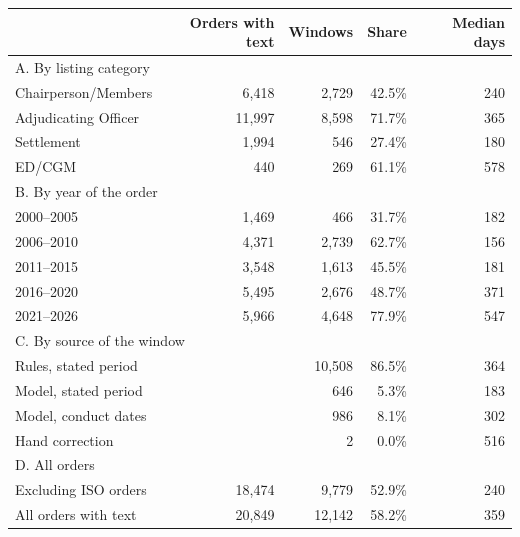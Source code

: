 \begin{tabular*}{\textwidth}[]{l@{\extracolsep\fill}rrrr}
\toprule
 & Orders with text & Windows & Share & Median days\\
\midrule
\multicolumn{5}{l}{A. By listing category}\\
Chairperson/Members & 6,418 & 2,729 & 42.5\% & 240\\
Adjudicating Officer & 11,997 & 8,598 & 71.7\% & 365\\
Settlement & 1,994 & 546 & 27.4\% & 180\\
ED/CGM & 440 & 269 & 61.1\% & 578\\
\midrule
\multicolumn{5}{l}{B. By year of the order}\\
2000--2005 & 1,469 & 466 & 31.7\% & 182\\
2006--2010 & 4,371 & 2,739 & 62.7\% & 156\\
2011--2015 & 3,548 & 1,613 & 45.5\% & 181\\
2016--2020 & 5,495 & 2,676 & 48.7\% & 371\\
2021--2026 & 5,966 & 4,648 & 77.9\% & 547\\
\midrule
\multicolumn{5}{l}{C. By source of the window}\\
Rules, stated period &  & 10,508 & 86.5\% & 364\\
Model, stated period &  & 646 & 5.3\% & 183\\
Model, conduct dates &  & 986 & 8.1\% & 302\\
Hand correction &  & 2 & 0.0\% & 516\\
\midrule
\multicolumn{5}{l}{D. All orders}\\
Excluding ISO orders & 18,474 & 9,779 & 52.9\% & 240\\
All orders with text & 20,849 & 12,142 & 58.2\% & 359\\
\bottomrule
\end{tabular*}
